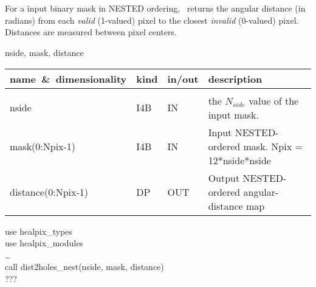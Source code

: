 \sloppy
{}\section[dist2holes\_nest]{ }
\label{sub:dist2holes_nest}
\author{Eric Hivon}

\begin{facility}
{For a input binary mask in NESTED ordering, \thedocid\ returns the angular distance (in
radians) from each {\em valid} (1-valued) pixel to the closest {\em invalid} (0-valued)
pixel. Distances are measured between pixel centers.}
{\modMaskTools}
\end{facility}

\begin{f90format}
{nside, mask, distance}
\end{f90format}

\begin{arguments}
{
\begin{tabular}{p{0.35\hsize} p{0.05\hsize} p{0.1\hsize} p{0.40\hsize}} \hline  
\textbf{name~\&~dimensionality} & \textbf{kind} & \textbf{in/out} & \textbf{description} \\ \hline
                   &   &   &                           \\ %
nside & I4B & IN & the $N_{side}$ value of the input mask. \\
mask(0:Npix-1) & I4B & IN & Input NESTED-ordered mask. Npix = 12*nside*nside\\
distance(0:Npix-1) & DP & OUT & Output NESTED-ordered angular-distance map
\end{tabular}
}
\end{arguments}

\begin{example}
{
use healpix\_types \\
use healpix\_modules \\
\ldots \\
call dist2holes\_nest(nside, mask, distance)  \\
}
{???
}
\end{example}

